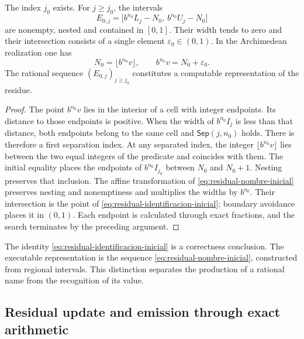 \begin{theorem}
\label{thm:residual-inicializacion}
The index \(j_0\) exists. For \(j\geq j_0\), the intervals
\begin{equation}
 E_{0,j}=
 \bigl[b^{n_0}L_j-N_0,\ b^{n_0}U_j-N_0\bigr]
 \label{eq:residual-nombre-inicial}
\end{equation}
are nonempty, nested and contained in \([0,1]\). Their width tends to
zero and their intersection consists of a single element
\(\varepsilon_0\in(0,1)\). In the Archimedean realization one has
\begin{equation}
 N_0=\lfloor b^{n_0}v\rfloor,
 \qquad b^{n_0}v=N_0+\varepsilon_0.
 \label{eq:residual-identificacion-inicial}
\end{equation}
The rational sequence \((E_{0,j})_{j\geq j_0}\) constitutes a
computable representation of the residue.
\end{theorem}
\begin{proof}
The point \(b^{n_0}v\) lies in the interior of a cell with integer
endpoints. Its distance to those endpoints is positive. When the width of
\(b^{n_0}I_j\) is less than that distance, both endpoints belong to the
same cell and \(\mathsf{Sep}(j,n_0)\) holds. There is therefore a
first separation index. At any separated index, the integer
\(\lfloor b^{n_0}v\rfloor\) lies between the two equal integers
of the predicate and coincides with them. The initial equality places the endpoints
of \(b^{n_0}I_{j_0}\) between \(N_0\) and \(N_0+1\). Nesting
preserves that inclusion. The affine transformation of
\eqref{eq:residual-nombre-inicial} preserves nesting and nonemptiness and
multiplies the widths by \(b^{n_0}\). Their intersection is the point of
\eqref{eq:residual-identificacion-inicial}; boundary avoidance
places it in \((0,1)\). Each endpoint is calculated through exact fractions,
and the search terminates by the preceding argument.
\end{proof}

The identity \eqref{eq:residual-identificacion-inicial} is a correctness
conclusion. The executable representation is the sequence
\eqref{eq:residual-nombre-inicial}, constructed from regional
intervals. This distinction separates the production of a rational name from the
recognition of its value.

\subsection{Residual update and emission through exact arithmetic}
\label{subsec:residual-actualizacion}

